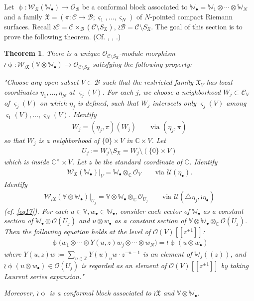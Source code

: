 \documentclass[12pt,a4paper,notitlepage]{article}
\theoremstyle{definition}
\theoremstyle{plain}
\newtheorem{thm}[df]{Theorem}
\newcommand{\fk}{\mathfrak}
\newcommand{\mc}{\mathcal}
\newcommand{\scr}{\mathscr}
\newcommand{\sgm}{\varsigma}
\newcommand{\SX}{{S_{\fk X}}}
\newcommand{\blt}{\bullet}
\newcommand{\Vbb}{\mathbb V}
\newcommand{\Wbb}{\mathbb W}
\newcommand{\Cbb}{\mathbb C}
\newcommand{\Zbb}{\mathbb Z}
\numberwithin{equation}{section}
\begin{document}
Let $\upphi:\scr W_{\fk X}(\Wbb_\blt)\rightarrow\scr O_{\mc B}$ be a conformal block associated to $\Wbb_\blt=\Wbb_1\otimes\cdots\otimes\Wbb_N$ and a family $\fk X=(\pi:\mc C\rightarrow\mc B;\sgm_1,\dots,\sgm_N)$ of $N$-pointed compact Riemann surfaces. Recall $\wr\mc C=\mc C\times_{\mc B}(\mc C\setminus\SX)$, $\wr\mc B=\mc C\setminus\SX$. The goal of this section is to prove the following theorem. (Cf. \cite[Sec. 6]{Zhu94}, \cite[Thm. 10.3.1]{FB04}, \cite[Thm. 3.6]{Cod19}.) 

\begin{thm}\label{lb4}
There is a unique $\scr O_{\mc C\setminus\SX}$-module morphism $\wr\upphi:\scr W_{\wr\fk X}(\Vbb\otimes\Wbb_\blt)\rightarrow\scr O_{\mc C\setminus\SX}$ satisfying the  following property: 

"Choose any open subset $V\subset\mc B$  such that the restricted family $\fk X_V$ has local coordinates $\eta_1,\dots,\eta_N$ at $\sgm_j(V)$. For each $j$, we choose a neighborhood $W_j\subset\mc C_V$ of $\sgm_j(V)$ on which $\eta_j$ is defined, such that $W_j$ intersects only $\sgm_j(V)$ among $\sgm_1(V),\dots,\sgm_N(V)$. Identify 
\begin{align*}
W_j=(\eta_j,\pi)(W_j)	\qquad\text{via }(\eta_j,\pi)
\end{align*}
so that $W_j$ is a neighborhood of $\{0\}\times V$ in $\Cbb\times V$. Let
\begin{align*}
U_j:=W_j\setminus\SX=W_j\setminus(\{0\}\times V)	
\end{align*}
which is inside $\Cbb^\times\times V$. Let $z$ be the standard coordinate of $\Cbb$. Identify
\begin{align*}
\scr W_{\fk X}(\Wbb_\blt)\big|_V=\Wbb_\blt\otimes_\Cbb\scr O_V	\qquad\text{via }\mc U(\eta_\blt).
\end{align*}
Identify 
\begin{align}
\scr W_{\wr\fk X}(\Vbb\otimes\Wbb_\blt)\big|_{U_j}=\Vbb\otimes\Wbb_\blt\otimes_\Cbb\scr O_{U_j}\qquad\text{via }\mc U(\triangle\eta_j,\wr\eta_\blt)\label{eq25}	
\end{align}
(cf. \eqref{eq17}). For each $u\in\Vbb,w_\blt\in\Wbb_\blt$, consider each vector of $\Wbb_\blt$ as a constant section of $\Wbb_\blt\otimes\scr O(U_j)$ and  $u\otimes w_\blt$ as a constant section of $\Vbb\otimes\Wbb_\blt\otimes_\Cbb\scr O(U_j)$. Then the following equation holds at the level of $\scr O(V)[[z^{\pm 1}]]$:
\begin{align}
\boxed{~\upphi\big(w_1\otimes\cdots\otimes Y(u,z)w_j\otimes\cdots\otimes w_N\big)=\wr\upphi(u\otimes w_\blt)~}\label{eq18}
\end{align}
where $Y(u,z)w:=\sum_{n\in\Zbb}Y(u)_nw\cdot z^{-n-1}$  is an element of $\Wbb_j((z))$, and  $\wr\upphi(u\otimes w_\blt)\in \scr O(U_j)$ is regarded as an element of $\scr O(V)[[z^{\pm 1}]]$ by taking Laurent series expansion."

Moreover, $\wr\upphi$ is a conformal block associated to $\wr\fk X$ and $\Vbb\otimes\Wbb_\blt$.
\end{thm}
\end{document}
